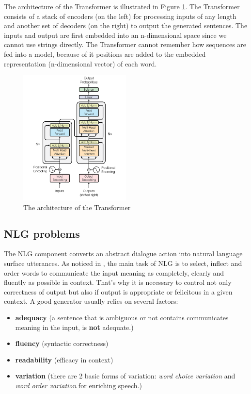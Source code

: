 The architecture of the Transformer is illustrated in Figure \ref{transformer}. The Transformer consists of a stack of encoders (on the left) for processing inputs of any length and another set of decoders (on the right) to output the generated sentences. The inputs and output are first embedded into an n-dimensional space since we cannot use strings directly. The Transformer cannot remember how sequences are fed into a model, because of it positions are added to the embedded representation (n-dimensional vector) of each word.

\begin{figure}[hbt]
  \centering
  \includegraphics[width=0.5\textwidth]{figures/transformer.png}
  \caption{The architecture of the Transformer\cite{transformer}}
  \label{transformer}
\end{figure}

\subsection*{NLG problems}
The NLG component converts an abstract dialogue action into natural language surface utterances. As noticed in \cite{generator_problems}, the main task of NLG is to select, inflect and order words to communicate the input meaning as completely, clearly and fluently as possible in context. That's why it is necessary to control not only correctness of output but also if output is appropriate or felicitous in a given context. A good generator usually relies on several factors:
\begin{itemize}
  \item \textbf{adequacy} (a sentence that is ambiguous or not contains communicates meaning in the input, is \textbf{not} adequate.)  
  \item \textbf{fluency} (syntactic correctness)
  \item \textbf{readability} (efficacy in context)
  \item \textbf{variation} (there are 2 basic forms of variation: \textit{word choice variation} and \textit{word order variation} for enriching speech.)
\end{itemize}

